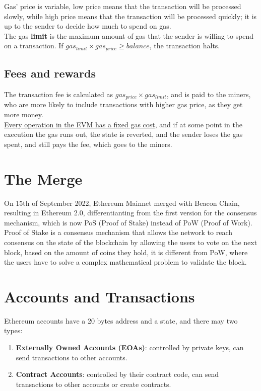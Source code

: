 Gas' price is variable, low price means that the transaction will be processed slowly, while high price means that the transaction will be processed quickly; it is up to the sender to decide how much to spend on gas.\\
The gas \textbf{limit} is the maximum amount of gas that the sender is willing to spend on a transaction.
If $gas_{limit} \times gas_{price} \geq balance$, the transaction halts.


\subsection*{Fees and rewards}
The transaction fee is calculated as $gas_{price} \times gas_{limit}$, and is paid to the miners, who are more likely to include transactions with higher gas price, as they get more money.\\

\ul{Every operation in the EVM has a fixed gas cost}, and if at some point in the execution the gas runs out, the state is reverted, and the sender loses the gas spent, and still pays the fee, which goes to the miners.\\

\section{The Merge}
On 15th of September 2022, Ethereum Mainnet merged with Beacon Chain, resulting in Ethereum 2.0, differentianting from the first version for the consensus mechanism, which is now PoS (Proof of Stake) instead of PoW (Proof of Work).\\
Proof of Stake is a consensus mechanism that allows the network to reach consensus on the state of the blockchain by allowing the users to vote on the next block, based on the amount of coins they hold, it is different from PoW, where the users have to solve a complex mathematical problem to validate the block.

\section{Accounts and Transactions}
Ethereum accounts have a 20 bytes address and a state, and there may two types:
\begin{enumerate}
   \item \textbf{Externally Owned Accounts (EOAs)}: controlled by private keys, can send transactions to other accounts.
   \item \textbf{Contract Accounts}: controlled by their contract code, can send transactions to other accounts or create contracts.
\end{enumerate} 

